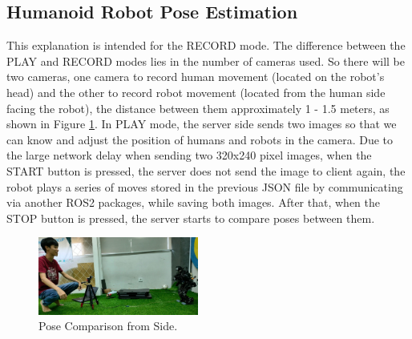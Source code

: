 \subsection{Humanoid Robot Pose Estimation}
\label{subsec:humanoid-robot-pose-estimation}

This explanation is intended for the RECORD mode. The difference between the PLAY and RECORD modes lies in the number of cameras used.
So there will be two cameras, one camera to record human movement (located on the robot's head) and the other to record robot movement (located from the human side facing the robot), the distance between them approximately 1 - 1.5 meters, as shown in Figure \ref{fig:pose-comparison-side}.
In PLAY mode, the server side sends two images so that we can know and adjust the position of humans and robots in the camera. Due to the large network delay when sending two 320x240 pixel images, when the START button is pressed,
the server does not send the image to client again, the robot plays a series of moves stored in the previous JSON file by communicating via another ROS2 packages, while saving both images. After that, when the STOP button is pressed, the server starts to compare poses between them.
\begin{figure}[ht]
  \centering
  \includegraphics[width=0.47\textwidth]{gambar/pose-comparison.jpeg}
  \caption{Pose Comparison from Side.}
  \label{fig:pose-comparison-side}
\end{figure}

